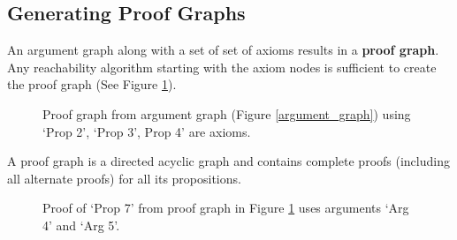 \documentclass[a4paper]{article}
\begin{document}
\subsection{Generating Proof Graphs}
An argument graph along with a set of set of axioms results in a \textbf{proof graph}. Any reachability algorithm starting with the axiom nodes is sufficient to create the proof graph (See Figure \ref{proof_graph1}).


\begin{figure}[htbp]
\begin{center}
\caption{Proof graph from argument graph (Figure \ref{argument_graph}) using `Prop 2', `Prop 3', Prop 4' are axioms.}
\label{proof_graph1}
\end{center}
\end{figure}


A proof graph is a directed acyclic graph and contains complete proofs (including all alternate proofs) for all its propositions.

\begin{figure}[htbp]
\begin{center}
\caption{Proof of `Prop 7' from proof graph in Figure \ref{proof_graph1} uses arguments `Arg 4' and `Arg 5'.}
\label{proof_prop7}
\end{center}
\end{figure}
\end{document}
